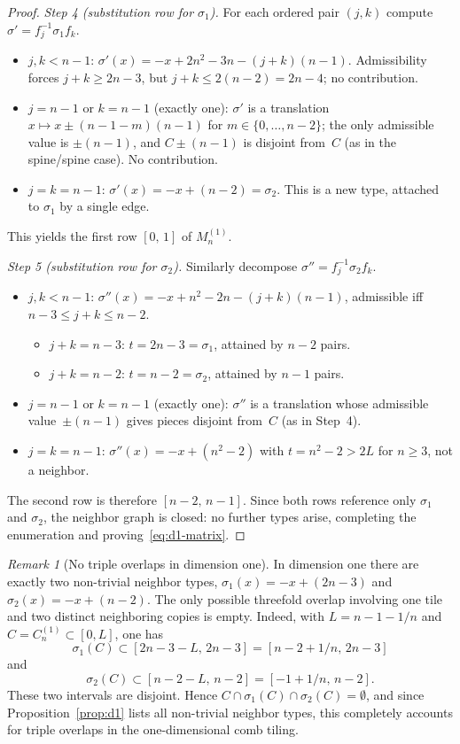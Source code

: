 \documentclass{amsart}
\theoremstyle{definition}
\theoremstyle{remark}
\newtheorem{remark}[theorem]{Remark}
\begin{document}
\begin{proof}
\emph{Step 4 (substitution row for $\sigma_1$).}  For each ordered
pair $(j, k)$ compute $\sigma' = f_j^{-1} \sigma_1 f_k$.
\begin{itemize}
\item $j, k < n{-}1$: $\sigma'(x) = -x + 2n^2 - 3n - (j+k)(n{-}1)$.
  Admissibility forces $j + k \ge 2n{-}3$, but
  $j + k \le 2(n{-}2) = 2n{-}4$; no contribution.
\item $j = n{-}1$ or $k = n{-}1$ (exactly one): $\sigma'$ is a
  translation $x \mapsto x \pm (n{-}1-m)(n{-}1)$ for
  $m \in \{0, \ldots, n{-}2\}$; the only admissible value is
  $\pm(n{-}1)$, and $C \pm (n{-}1)$ is disjoint from~$C$ (as
  in the spine/spine case).  No contribution.
\item $j = k = n{-}1$: $\sigma'(x) = -x + (n{-}2) = \sigma_2$.
  This is a new type, attached to $\sigma_1$ by a single edge.
\end{itemize}
This yields the first row $[0,\, 1]$ of $M_n^{(1)}$.

\emph{Step 5 (substitution row for $\sigma_2$).}  Similarly
decompose $\sigma'' = f_j^{-1} \sigma_2 f_k$.
\begin{itemize}
\item $j, k < n{-}1$: $\sigma''(x) = -x + n^2 - 2n - (j+k)(n{-}1)$,
  admissible iff $n{-}3 \le j + k \le n{-}2$.
  \begin{itemize}
    \item $j + k = n{-}3$: $t = 2n{-}3 = \sigma_1$,
          attained by $n{-}2$ pairs.
    \item $j + k = n{-}2$: $t = n{-}2 = \sigma_2$,
          attained by $n{-}1$ pairs.
  \end{itemize}
\item $j = n{-}1$ or $k = n{-}1$ (exactly one): $\sigma''$ is a
  translation whose admissible value~$\pm(n{-}1)$ gives pieces
  disjoint from~$C$ (as in Step~4).
\item $j = k = n{-}1$: $\sigma''(x) = -x + (n^2{-}2)$ with
  $t = n^2 - 2 > 2L$ for $n \ge 3$, not a neighbor.
\end{itemize}
The second row is therefore $[n{-}2,\, n{-}1]$.  Since both rows
reference only $\sigma_1$ and $\sigma_2$, the neighbor graph is
closed: no further types arise, completing the enumeration and
proving~\eqref{eq:d1-matrix}.
\end{proof}

\begin{remark}[No triple overlaps in dimension one]
\label{rem:d1-no-triple-overlaps}
In dimension one there are exactly two non-trivial neighbor types,
$\sigma_1(x)=-x+(2n{-}3)$ and $\sigma_2(x)=-x+(n{-}2)$.
The only possible threefold overlap involving one tile and two
distinct neighboring copies is empty.  Indeed, with
$L=n{-}1-1/n$ and $C=C_n^{(1)}\subset [0,L]$, one has
\[
  \sigma_1(C) \subset [2n{-}3-L,\,2n{-}3]
      = [n{-}2+1/n,\,2n{-}3]
\]
and
\[
  \sigma_2(C) \subset [n{-}2-L,\,n{-}2]
      = [-1+1/n,\,n{-}2].
\]
These two intervals are disjoint.  Hence
$C\cap\sigma_1(C)\cap\sigma_2(C)=\emptyset$, and since
Proposition~\ref{prop:d1} lists all non-trivial neighbor types,
this completely accounts for triple overlaps in the one-dimensional
comb tiling.
\end{remark}
\end{document}
